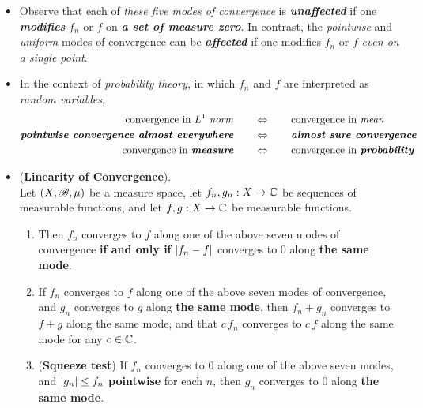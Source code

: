 \documentclass[11pt]{article}
\begin{document}
\begin{itemize}
\item \begin{remark}
Observe that each of \emph{these five modes of convergence} is \emph{\textbf{unaffected}} if one \emph{\textbf{modifies}} $f_n$ or $f$ on \emph{\textbf{a set of measure zero}}. In contrast, the \emph{pointwise} and \emph{uniform} modes of convergence can be \emph{\textbf{affected}} if one modifies $f_n$ or $f$ \emph{even on a single point}.
\end{remark}

\item \begin{remark}
In the context of \emph{probability theory}, in which $f_n$ and $f$ are interpreted as \emph{random variables}, \citep{billingsley2008probability, folland2013real}
\begin{align*}
\text{convergence in $L^1$ \emph{norm}} \qquad &\Leftrightarrow \qquad \text{convergence in \emph{mean}}\\
\text{\emph{\textbf{pointwise convergence almost everywhere}}}\qquad  &\Leftrightarrow \qquad \text{\emph{\textbf{almost sure convergence}}}\\
\text{convergence in \emph{\textbf{measure}}} \qquad &\Leftrightarrow  \qquad \text{convergence in \emph{\textbf{probability}}}
\end{align*}
\end{remark}

\item \begin{proposition} (\textbf{Linearity of Convergence}). \citep{tao2011introduction} \\
Let $(X, {\mathscr B}, \mu)$ be a measure space, let $f_n, g_n : X \rightarrow {\mathbb C}$ be sequences of measurable functions, and let $f, g : X \rightarrow {\mathbb C}$ be measurable functions.
\begin{enumerate}
\item Then $f_n$ converges to $f$ along one of the above seven modes of convergence \textbf{if and only if} $\left\lvert f_n - f \right\rvert$ converges to 0
along \textbf{the same mode}.
\item If $f_n$ converges to $f$ along one of the above seven modes of convergence, and $g_n$ converges to $g$ along \textbf{the same mode},
then $f_n + g_n$ converges to $f + g$ along the same mode, and that $c\,f_n$ converges to $c\,f$ along the same mode for any $c \in {\mathbb C}$.
\item (\textbf{Squeeze test}) If $f_n$ converges to $0$ along one of the above seven modes, and $\left\lvert g_n \right\rvert \le f_n$ \textbf{pointwise} for each $n$, then 
$g_n$ converges to $0$ along \textbf{the same mode}.
\end{enumerate}
\end{proposition}
\end{itemize}
\end{document}
